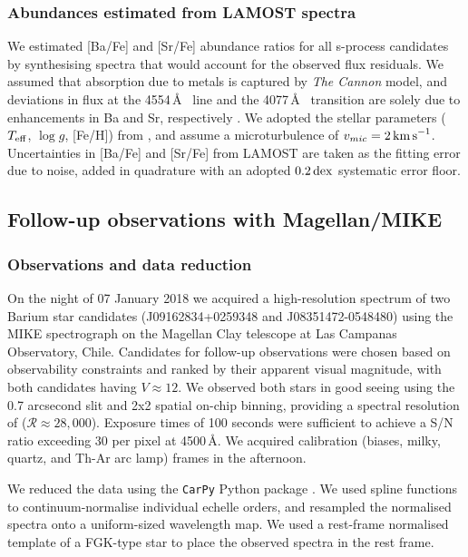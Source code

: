 \documentclass[a4paper,fleqn,usenatbib]{mnras}
\begin{document}
\subsubsection{Abundances estimated from LAMOST spectra}
We estimated [Ba/Fe] and [Sr/Fe] abundance ratios for all s-process candidates by synthesising spectra that would account for the observed flux residuals. We assumed that absorption due to metals is captured by \emph{The Cannon} model, and deviations in flux at the 4554\,\AA\  line and the 4077\,\AA\  transition are solely due to enhancements in Ba and Sr, respectively \citep{marcs,sme,vald,ispec}. We adopted the stellar parameters ($T_{\rm eff}$, $\log{g}$, [Fe/H]) from \citep{ho2017}, and assume a microturbulence of $v_{mic} = 2\,{\rm km\,s}^{-1}$. Uncertainties in [Ba/Fe] and [Sr/Fe] from LAMOST are taken as the fitting error due to noise, added in quadrature with an adopted $0.2\,{\rm dex}$ systematic error floor.


\subsection{Follow-up observations with Magellan/MIKE}

\subsubsection{Observations and data reduction}
On the night of 07 January 2018 we acquired a high-resolution spectrum of two Barium star candidates (J09162834+0259348 and J08351472-0548480) using the MIKE spectrograph on the Magellan Clay telescope at Las Campanas Observatory, Chile. Candidates for follow-up observations were chosen based on observability constraints and ranked by their apparent visual magnitude, with both candidates having $V \approx 12$. We observed both stars in good seeing using the 0.7 arcsecond slit and 2x2 spatial on-chip binning, providing a spectral resolution of ($\mathcal{R} \approx 28,000$). Exposure times of 100 seconds were sufficient to achieve a S/N ratio exceeding 30 per pixel at 4500\,\AA. We acquired calibration (biases, milky, quartz, and Th-Ar arc lamp) frames in the afternoon.

We reduced the data using the \texttt{CarPy} Python package \citep{kelson2000,kelson2003}. We used spline functions to continuum-normalise individual echelle orders, and resampled the normalised spectra onto a uniform-sized wavelength map. We used a rest-frame normalised template of a FGK-type star to place the observed spectra in the rest frame.
\end{document}
